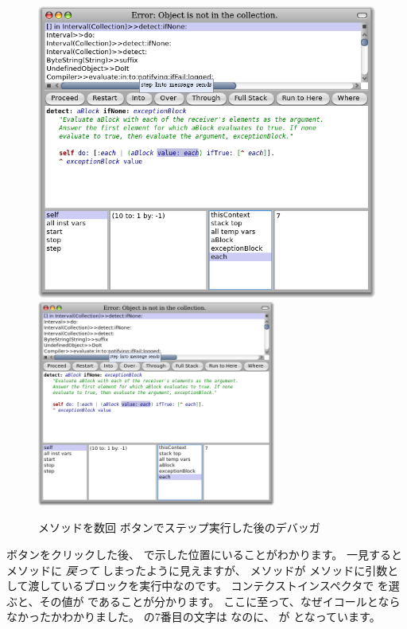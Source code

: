 \documentclass[a4paper,10pt,twoside]{book}
\begin{document}
\begin{figure}[btp]
\begin{center}
\ifluluelse
{\includegraphics[width=\textwidth]{steppingIntoValue}}
{\includegraphics[width=0.7\textwidth]{steppingIntoValue}}
\end{center}
\caption{ メソッドを数回  ボタンでステップ実行した後のデバッガ}
\end{figure}

 ボタンをクリックした後、 で示した位置にいることがわかります。
一見すると  メソッドに \emph{戻って} しまったように見えますが、 メソッドが  メソッドに引数として渡しているブロックを実行中なのです。
コンテクストインスペクタで  を選ぶと、その値が  であることが分かります。
ここに至って、なぜイコールとならなかったかわかりました。 の7番目の文字は  なのに、 が  となっています。
\end{document}
